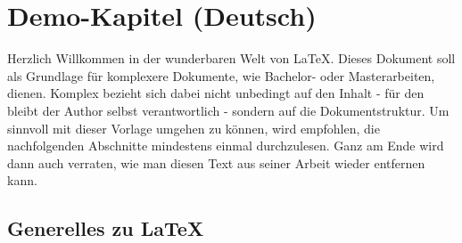 %
%
%
\chapter{Demo-Kapitel (Deutsch)}
%
Herzlich Willkommen in der wunderbaren Welt von \LaTeX{}.
Dieses Dokument soll als Grundlage für komplexere Dokumente, wie Bachelor-
oder Masterarbeiten, dienen.\citep{Li2011}
Komplex bezieht sich dabei nicht unbedingt auf den Inhalt - für den bleibt
der Author selbst verantwortlich - sondern auf die Dokumentstruktur.
Um sinnvoll mit dieser Vorlage umgehen zu können, wird empfohlen, die
nachfolgenden Abschnitte mindestens einmal durchzulesen.
Ganz am Ende wird dann auch verraten, wie man diesen Text aus seiner
Arbeit wieder entfernen kann.
%
\section{Generelles zu \LaTeX{}}
%
